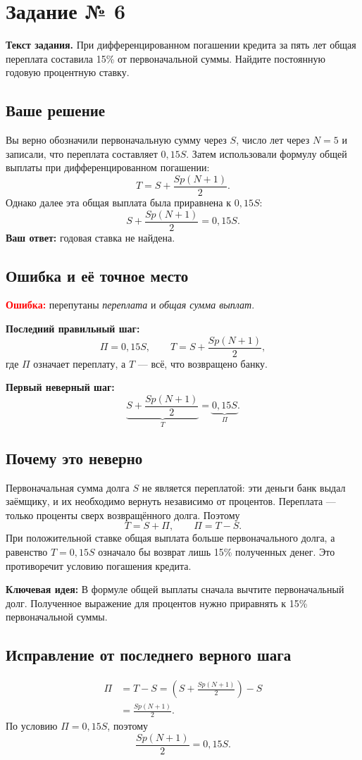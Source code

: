 \documentclass[12pt,a4paper]{article}
\newcommand{\Err}{\textcolor{red}{\textbf{Ошибка:}}}
\newcommand{\Idea}{\textcolor{blue!60!black}{\textbf{Ключевая идея:}}}
\begin{document}
\label{task:6}
\section*{Задание № 6}
\textbf{Текст задания.} При дифференцированном погашении кредита за пять лет общая переплата составила 15\% от первоначальной суммы. Найдите постоянную годовую процентную ставку.

\subsection*{Ваше решение}
Вы верно обозначили первоначальную сумму через $S$, число лет через $N=5$ и записали, что переплата составляет $0{,}15S$. Затем использовали формулу общей выплаты при дифференцированном погашении:
\[
T=S+\frac{Sp(N+1)}{2}.
\]
Однако далее эта общая выплата была приравнена к $0{,}15S$:
\[
S+\frac{Sp(N+1)}{2}=0{,}15S.
\]
\textbf{Ваш ответ:} годовая ставка не найдена.

\subsection*{Ошибка и её точное место}
\Err{} перепутаны \emph{переплата} и \emph{общая сумма выплат}.

\textbf{Последний правильный шаг:}
\[
\Pi=0{,}15S,\qquad T=S+\frac{Sp(N+1)}{2},
\]
где $\Pi$ означает переплату, а $T$ --- всё, что возвращено банку.

\textbf{Первый неверный шаг:}
\[
\underbrace{S+\frac{Sp(N+1)}{2}}_{T}=\underbrace{0{,}15S}_{\Pi}.
\]

\subsection*{Почему это неверно}
Первоначальная сумма долга $S$ не является переплатой: эти деньги банк выдал заёмщику, и их необходимо вернуть независимо от процентов. Переплата --- только проценты сверх возвращённого долга. Поэтому
\[
T=S+\Pi,\qquad \Pi=T-S.
\]
При положительной ставке общая выплата больше первоначального долга, а равенство $T=0{,}15S$ означало бы возврат лишь 15\% полученных денег. Это противоречит условию погашения кредита.

\Idea{} В формуле общей выплаты сначала вычтите первоначальный долг. Полученное выражение для процентов нужно приравнять к 15\% первоначальной суммы.

\subsection*{Исправление от последнего верного шага}
\[
\begin{aligned}
\Pi&=T-S
=\left(S+\frac{Sp(N+1)}{2}\right)-S\\
&=\frac{Sp(N+1)}{2}.
\end{aligned}
\]
По условию $\Pi=0{,}15S$, поэтому
\[
\frac{Sp(N+1)}{2}=0{,}15S.
\]
\end{document}
